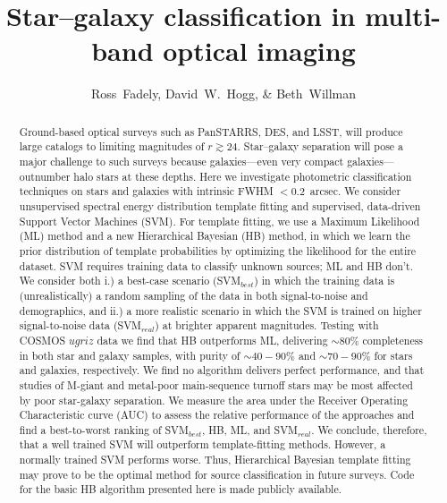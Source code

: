 \documentclass[12pt,preprint]{aastex}
\begin{document}
\title{Star--galaxy classification in multi-band optical imaging}
\author{Ross~Fadely,
        David~W.~Hogg,
        \& Beth~Willman}


%
%
\begin{abstract}
  Ground-based optical surveys such as PanSTARRS, DES, and LSST, will
  produce large catalogs to limiting magnitudes of $r \gtrsim 24$.
  Star--galaxy separation will pose a major challenge to such surveys
  because galaxies---even very compact galaxies---outnumber halo stars
  at these depths.  Here we investigate photometric classification
  techniques on stars and galaxies with intrinsic FWHM $<0.2$~arcsec.
  We consider unsupervised spectral energy distribution template
  fitting and supervised, data-driven Support Vector Machines (SVM).
  For template fitting, we use a Maximum Likelihood (ML) method and a
  new Hierarchical Bayesian (HB) method, in which we learn the prior
  distribution of template probabilities by optimizing the likelihood
  for the entire dataset.  SVM requires training data to classify
  unknown sources; ML and HB don't.  We consider both i.) a
  best-case scenario (SVM$_{best}$) in which the training data is
  (unrealistically) a random sampling of the data in both
  signal-to-noise and demographics, and ii.) a more realistic scenario
  in which the SVM is trained on higher signal-to-noise data
  (SVM$_{real}$) at brighter apparent magnitudes.  Testing with COSMOS
  $ugriz$ data we find that HB outperforms ML, delivering $\sim80\%$
  completeness in both star and galaxy samples, with purity of
  $\sim40-90\%$ and $\sim70-90\%$ for stars and galaxies,
  respectively.  We find no algorithm delivers perfect performance, and 
  that studies of M-giant and metal-poor main-sequence turnoff stars
  may be 
  most affected by poor star-galaxy separation.  We measure the area 
  under the Receiver Operating Characteristic curve (AUC) to assess the 
  relative performance of the approaches and find a best-to-worst 
  ranking of SVM$_{best}$, HB, ML, and SVM$_{real}$.  We conclude, therefore, that a well
  trained SVM will outperform template-fitting methods.  However, a
  normally trained SVM performs worse.  Thus, Hierarchical Bayesian
  template fitting may prove to be the optimal method for source
  classification in future surveys.  Code for the basic HB algorithm presented 
  here is made publicly available.
\end{abstract}
\end{document}
